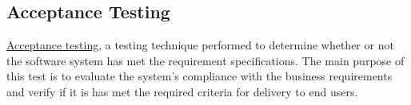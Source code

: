 \subsection{Acceptance Testing}

\href{http://en.wikipedia.org/wiki/Acceptance\_testing}{Acceptance testing}, a testing technique performed to determine whether or not the software system has met the requirement specifications. The main purpose of this test is to evaluate the system's compliance with the business requirements and verify if it is has met the required criteria for delivery to end users.